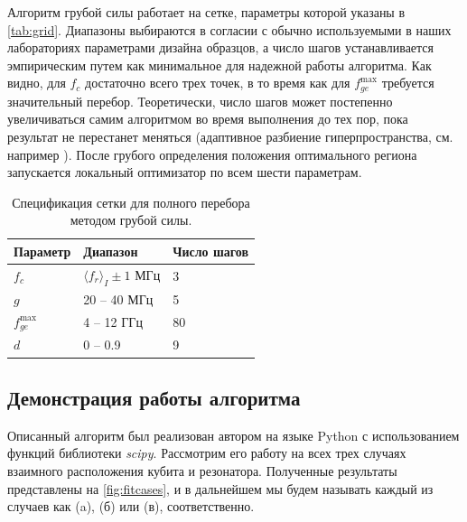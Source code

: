 \documentclass[14pt, a4paper]{extreport}
\numberwithin{equation}{section}
\begin{document}
Алгоритм грубой силы работает на сетке, параметры которой указаны в \autoref{tab:grid}. Диапазоны выбираются в согласии с обычно используемыми в наших лабораториях параметрами дизайна образцов, а число шагов устанавливается эмпирическим путем как минимальное для надежной работы алгоритма. Как видно, для $f_c$ достаточно всего трех точек, в то время как для $f_{ge}^\text{max}$ требуется значительный перебор. Теоретически, число шагов может постепенно увеличиваться самим алгоритмом во время выполнения до тех пор, пока результат не перестанет меняться (адаптивное разбиение гиперпространства, см. например \cite{Nijholt2019}). После грубого определения положения оптимального региона запускается локальный оптимизатор по всем шести параметрам.

\begin{table}
	\centering
		\small{\begin{tabular}{lll} \toprule
			Параметр & Диапазон & Число шагов \\ 
			\midrule
			$f_c$ & $\langle f_r \rangle_{I} \pm 1$ МГц & 3\\ 
			$g$ & 20 -- 40 МГц & 5\\
			$f_{ge}^\text{max}$ &  4 -- 12 ГГц & 80 \\
			$d$& 0 -- 0.9 & 9\\
			\bottomrule
		\end{tabular} }
	\caption{Спецификация сетки для полного перебора методом грубой силы.}
	\label{tab:grid}
\end{table}

\subsection{Демонстрация работы алгоритма}

Описанный алгоритм был реализован автором на языке \foreignlanguage{english}{Python} с использованием функций библиотеки \foreignlanguage{english}{\textit{scipy}}. Рассмотрим его работу на всех трех случаях взаимного расположения кубита и резонатора. Полученные результаты представлены на \autoref{fig:fitcases}, и в дальнейшем мы будем называть каждый из случаев как (a), (б) или (в), соответственно.
\end{document}
